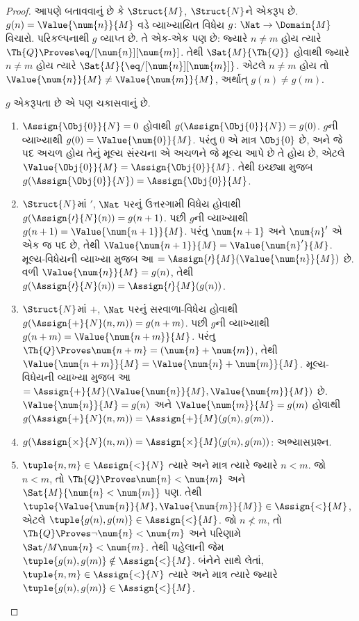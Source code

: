 \begin{proof}
આપણે બતાવવાનું છે કે $\Struct{M}$, $\Struct{N}$ને એકરૂપ છે.
$g(n)=\Value{\num{n}}{M}$ વડે વ્યાખ્યાયિત વિધેય
$g\colon\Nat\to\Domain{M}$ વિચારો. પરિકલ્પનાથી $g$ વ્યાપ્ત
છે. તે એક-એક પણ છે: જ્યારે $n\neq m$ હોય ત્યારે
$\Th{Q}\Proves\eq/[\num{n}][\num{m}]$. તેથી
$\Sat{M}{\Th{Q}}$ હોવાથી જ્યારે $n\neq m$ હોય ત્યારે
$\Sat{M}{\eq/[\num{n}][\num{m}]}$. એટલે $n\neq m$ હોય તો
$\Value{\num{n}}{M}\neq\Value{\num{m}}{M}$, અર્થાત્ $g(n)\neq g(m)$.

$g$ એકરૂપતા છે એ પણ ચકાસવાનું છે.
\begin{enumerate}
\item $\Assign{\Obj{0}}{N}=0$ હોવાથી
  $g(\Assign{\Obj{0}}{N})=g(0)$. $g$ની વ્યાખ્યાથી
  $g(0)=\Value{\num{0}}{M}$. પરંતુ $\num{0}$ એ માત્ર $\Obj{0}$ છે,
  અને જે પદ અચળ હોય તેનું મૂલ્ય સંરચના એ
  અચળને જે મૂલ્ય આપે છે તે હોય છે, એટલે
  $\Value{\Obj{0}}{M}=\Assign{\Obj{0}}{M}$. તેથી ઇચ્છ્યા મુજબ
  $g(\Assign{\Obj{0}}{N})=\Assign{\Obj{0}}{M}$.
\item $\Struct{N}$માં $\prime$, $\Nat$ પરનું ઉત્તરગામી વિધેય હોવાથી
  $g(\Assign{\prime}{N}(n))=g(n+1)$. પછી $g$ની વ્યાખ્યાથી
  $g(n+1)=\Value{\num{n+1}}{M}$. પરંતુ $\num{n+1}$ અને
  $\num{n}'$ એ એક જ પદ છે, તેથી
  $\Value{\num{n+1}}{M}=\Value{\num{n}'}{M}$. મૂલ્ય-વિધેયની
  વ્યાખ્યા મુજબ આ
  $=\Assign{\prime}{M}(\Value{\num{n}}{M})$ છે. વળી
  $\Value{\num{n}}{M}=g(n)$, તેથી
  $g(\Assign{\prime}{N}(n))=\Assign{\prime}{M}(g(n))$.
\item $\Struct{N}$માં $+$, $\Nat$ પરનું સરવાળા-વિધેય હોવાથી
  $g(\Assign{+}{N}(n,m))=g(n+m)$. પછી $g$ની વ્યાખ્યાથી
  $g(n+m)=\Value{\num{n+m}}{M}$. પરંતુ
  $\Th{Q}\Proves\num{n+m}=(\num{n}+\num{m})$, તેથી
  $\Value{\num{n+m}}{M}=\Value{\num{n}+\num{m}}{M}$. મૂલ્ય-વિધેયની
  વ્યાખ્યા મુજબ આ
  $=\Assign{+}{M}(\Value{\num{n}}{M},\Value{\num{m}}{M})$ છે.
  $\Value{\num{n}}{M}=g(n)$ અને $\Value{\num{m}}{M}=g(m)$ હોવાથી
  $g(\Assign{+}{N}(n,m))=\Assign{+}{M}(g(n),g(m))$.
\item $g(\Assign{\times}{N}(n,m))=
  \Assign{\times}{M}(g(n),g(m))$: અભ્યાસપ્રશ્ન.
\item $\tuple{n,m}\in\Assign{<}{N}$ ત્યારે અને માત્ર ત્યારે જ્યારે
  $n<m$. જો $n<m$, તો $\Th{Q}\Proves\num{n}<\num{m}$ અને
  $\Sat{M}{\num{n}<\num{m}}$ પણ. તેથી
  $\tuple{\Value{\num{n}}{M},\Value{\num{m}}{M}}\in\Assign{<}{M}$,
  એટલે $\tuple{g(n),g(m)}\in\Assign{<}{M}$. જો $n\not<m$, તો
  $\Th{Q}\Proves\lnot\num{n}<\num{m}$ અને પરિણામે
  $\Sat/{M}{\num{n}<\num{m}}$. તેથી પહેલાની જેમ
  $\tuple{g(n),g(m)}\notin\Assign{<}{M}$. બંનેને સાથે લેતાં,
  $\tuple{n,m}\in\Assign{<}{N}$ ત્યારે અને માત્ર ત્યારે જ્યારે
  $\tuple{g(n),g(m)}\in\Assign{<}{M}$.
\end{enumerate}
\end{proof}


